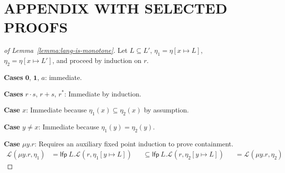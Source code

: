 \documentclass[runningheads, envcountsame, a4paper]{llncs}
\newcommand\LFP{\textsf{lfp}}
\newcommand\Rnull{\mathbf0}
\newcommand\Rempty{\mathbf1}
\newcommand\Lang[1][{}]{\mathcal{L}^{#1}}
\begin{document}
\section{APPENDIX WITH SELECTED PROOFS}
\begin{proof}[of Lemma~\ref{lemma:lang-is-monotone}]
  Let $L\subseteq L'$, $\eta_1 = \eta[x \mapsto L]$,  $\eta_2 = \eta[x \mapsto L']$, and proceed by induction on $r$.

  \textbf{Cases }$\Rnull$, $\Rempty$, $a$: immediate.

  \textbf{Cases }$r\cdot s$, $r + s$, $r^*$: Immediate by induction.

  \textbf{Case }$x$: Immediate because $\eta_1 (x) \subseteq \eta_2
  (x)$ by assumption.

  \textbf{Case }$y\ne x$: Immediate because $\eta_1 (y) = \eta_2 (y)$.

  \textbf{Case }$\mu y.r$: Requires an auxiliary fixed point induction to
  prove containment.
  \begin{align*}
    \Lang (\mu y.r, {\eta_1})
    &= \LFP\ L. \Lang (r, {\eta_1[y \mapsto L]}) 
    &&\subseteq \LFP\ L. \Lang (r, { \eta_2[y \mapsto L]})
    &&= \Lang (\mu y.r, {\eta_2})
  \end{align*}
\end{proof}
\end{document}
